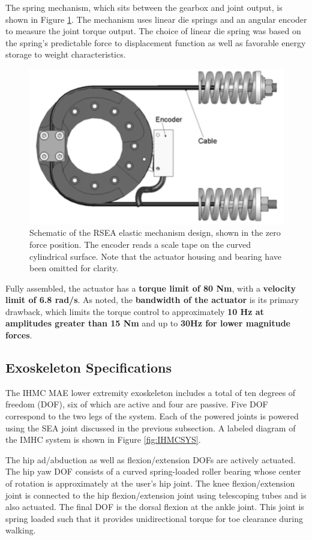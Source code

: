 \begin{refsection}
The spring mechanism, which sits between the gearbox and joint output, is shown in Figure \ref{fig:IHMCSEA}.  The mechanism uses linear die springs and an angular encoder to measure the joint torque output.  The choice of linear die spring was based on the spring's predictable force to displacement function as well as favorable energy storage to weight characteristics.  
\begin{figure}[thpb]
\centering
\includegraphics[width=3.in]{exos/figs/ihmc/seaAssm}
  \caption{Schematic of the RSEA elastic mechanism design, shown in the zero force position. The encoder reads a scale tape on the curved cylindrical surface. Note that the actuator housing and bearing have been omitted for clarity.}
 \label{fig:IHMCSEA}   
 \end{figure}
 
Fully assembled, the actuator has a  {\bf torque limit of 80 Nm}, with a {\bf velocity limit of 6.8 rad/s}.  As noted, the {\bf bandwidth of the actuator} is its primary drawback, which limits the torque control to approximately {\bf 10 Hz at amplitudes greater than 15 Nm} and up to {\bf 30Hz for lower magnitude forces}. 
 
 \subsection{Exoskeleton Specifications}
 
 The IHMC MAE lower extremity exoskeleton includes a total of ten degrees of freedom (DOF), six of which are active and four are passive.  Five DOF correspond to the two legs of the system.  Each of the powered joints is powered using the SEA joint discussed in the previous subsection.  A labeled diagram of the IMHC system is shown in Figure \ref{fig:IHMCSYS}.  
 
 The hip ad/abduction as well as flexion/extension DOFs are actively actuated.  The hip yaw DOF consists of a curved spring-loaded roller bearing whose center of rotation is approximately at the user's hip joint. The knee flexion/extension joint is connected to the hip flexion/extension joint using telescoping tubes and is also actuated.  The final DOF is the dorsal flexion at the ankle joint.  This joint is spring loaded such that it provides unidirectional torque for toe clearance during walking.
 

\end{refsection}

